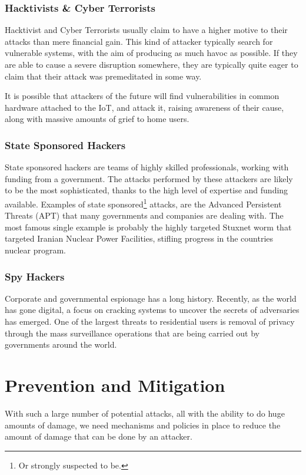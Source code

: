 \documentclass[10pt,journal,compsoc]{IEEEtran}
\begin{document}
\subsubsection{Hacktivists \& Cyber Terrorists}
Hacktivist and Cyber Terrorists usually claim to have a higher motive to their
attacks than mere financial gain. This kind of attacker typically search for
vulnerable systems, with the aim of producing as much havoc as possible. If
they are able to cause a severe disruption somewhere, they are typically quite
eager to claim that their attack was premeditated in some way. 

It is possible that attackers of the future will find vulnerabilities in common
hardware attached to the IoT, and attack it, raising awareness of their cause,
along with massive amounts of grief to home users. 

\subsubsection{State Sponsored Hackers}
State sponsored hackers are teams of highly skilled professionals, working with
funding from a government. The attacks performed by these attackers are likely
to be the most sophisticated, thanks to the high level of expertise and funding
available. Examples of state sponsored\footnote{Or strongly suspected to be.}
attacks, are the Advanced Persistent Threats (APT) that many governments and
companies are dealing with. The most famous single example is probably the
highly targeted Stuxnet worm that targeted Iranian Nuclear Power Facilities,
stifling progress in the countries nuclear program. 

\subsubsection{Spy Hackers}
Corporate and governmental espionage has a long history. Recently, as the world
has gone digital, a focus on cracking systems to uncover the secrets of
adversaries has emerged. One of the largest threats to residential users is
removal of privacy through the mass surveillance operations that are being
carried out by governments around the world.  

\section{Prevention and Mitigation}
With such a large number of potential attacks, all with the ability to do huge
amounts of damage, we need mechanisms and policies in place to reduce the
amount of damage that can be done by an attacker. 
\end{document}
